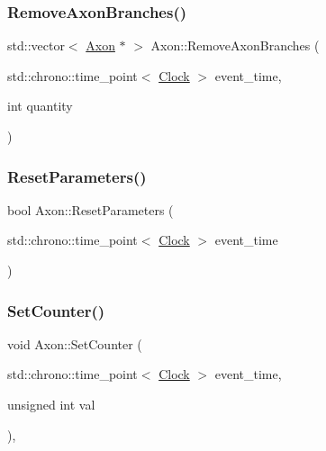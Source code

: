 \mbox{\label{classAxon_a4c7af6c0900ae766c55362bfbb827ce3}} 
\subsubsection{\texorpdfstring{Remove\+Axon\+Branches()}{RemoveAxonBranches()}}
{\footnotesize\ttfamily std\+::vector$<$ \mbox{\hyperlink{classAxon}{Axon}} $\ast$ $>$ Axon\+::\+Remove\+Axon\+Branches (\begin{DoxyParamCaption}\item[{std\+::chrono\+::time\+\_\+point$<$ \mbox{\hyperlink{universe_8h_a0ef8d951d1ca5ab3cfaf7ab4c7a6fd80}{Clock}} $>$}]{event\+\_\+time,  }\item[{int}]{quantity }\end{DoxyParamCaption})}

\mbox{\label{classAxon_ae079e0b47f5027625da158930e4fa9c5}} 
\subsubsection{\texorpdfstring{Reset\+Parameters()}{ResetParameters()}}
{\footnotesize\ttfamily bool Axon\+::\+Reset\+Parameters (\begin{DoxyParamCaption}\item[{std\+::chrono\+::time\+\_\+point$<$ \mbox{\hyperlink{universe_8h_a0ef8d951d1ca5ab3cfaf7ab4c7a6fd80}{Clock}} $>$}]{event\+\_\+time }\end{DoxyParamCaption})}

\mbox{\label{classAxon_a3493cb97bde26bd66facc6084cd5f219}} 
\subsubsection{\texorpdfstring{Set\+Counter()}{SetCounter()}}
{\footnotesize\ttfamily void Axon\+::\+Set\+Counter (\begin{DoxyParamCaption}\item[{std\+::chrono\+::time\+\_\+point$<$ \mbox{\hyperlink{universe_8h_a0ef8d951d1ca5ab3cfaf7ab4c7a6fd80}{Clock}} $>$}]{event\+\_\+time,  }\item[{unsigned int}]{val }\end{DoxyParamCaption})\hspace{0.3cm}{\ttfamily [inline]}, {\ttfamily [virtual]}}




